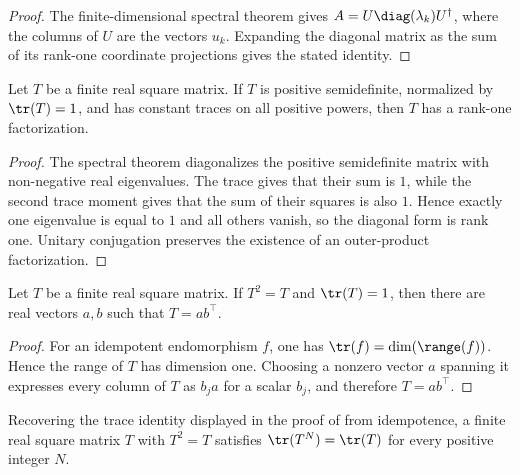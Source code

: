 \begin{proof}
    \leanok
    The finite-dimensional spectral theorem gives
    $A=U\diag(\lambda_k)U^\dagger$, where the columns of $U$ are
    the vectors $u_k$. Expanding the diagonal matrix as the sum of its
    rank-one coordinate projections gives the stated identity.
\end{proof}

\begin{lemma}
    \label{thm:matrix_psd_trace_power_rank_one}
    \leanok
    Let $T$ be a finite real square matrix. If $T$ is positive semidefinite,
    normalized by $\tr(T)=1$, and has constant traces on all positive powers,
    then $T$ has a rank-one factorization.
\end{lemma}

\begin{proof}
    \leanok
    The spectral theorem diagonalizes the positive semidefinite matrix with
    non-negative real eigenvalues. The trace gives that their sum is $1$, while
    the second trace moment gives that the sum of their squares is also $1$.
    Hence exactly one eigenvalue is equal to $1$ and all others vanish, so the
    diagonal form is rank one. Unitary conjugation preserves the existence of an
    outer-product factorization.
\end{proof}

\begin{lemma}
    \label{thm:matrix_idempotent_trace_one_rank_one}
    \leanok
    Let $T$ be a finite real square matrix. If $T^2=T$ and $\tr(T)=1$, then
    there are real vectors $a,b$ such that $T=ab^\top$.
\end{lemma}

\begin{proof}
    \leanok
    For an idempotent endomorphism $f$, one has
    $\tr(f)=\dim(\range(f))$. Hence the range of $T$ has dimension one.
    Choosing a nonzero vector $a$ spanning it expresses every column of $T$ as
    $b_j a$ for a scalar $b_j$, and therefore $T=ab^\top$.
\end{proof}

\begin{lemma}
    \label{thm:matrix_idempotent_trace_powers_constant}
    \leanok
    Recovering the trace identity displayed in the proof of
    \cite[Appendix~C.2, Lemma~C.5]{Cirac2016MPDO_arXiv} from idempotence, a
    finite real square matrix $T$ with $T^2=T$ satisfies $\tr(T^N)=\tr(T)$ for
    every positive integer $N$.
\end{lemma}

